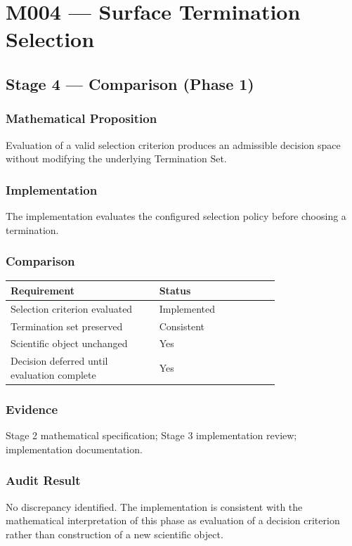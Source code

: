 \chapter{M004 --- Surface Termination Selection}

\section{Stage 4 --- Comparison (Phase 1)}

\subsection{Mathematical Proposition}

Evaluation of a valid selection criterion produces an admissible decision
space without modifying the underlying Termination Set.

\subsection{Implementation}

The implementation evaluates the configured selection policy before
choosing a termination.

\subsection{Comparison}

\begin{tabular}{|p{0.42\linewidth}|p{0.34\linewidth}|}
\hline
Requirement & Status\\\hline
Selection criterion evaluated & Implemented\\
Termination set preserved & Consistent\\
Scientific object unchanged & Yes\\
Decision deferred until evaluation complete & Yes\\
\hline
\end{tabular}

\subsection{Evidence}

Stage 2 mathematical specification; Stage 3 implementation review;
implementation documentation.

\subsection{Audit Result}

No discrepancy identified. The implementation is consistent with the
mathematical interpretation of this phase as evaluation of a decision
criterion rather than construction of a new scientific object.
